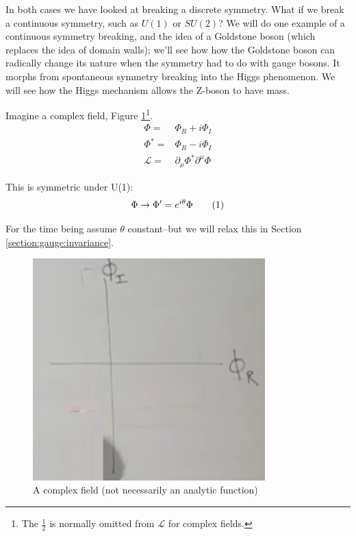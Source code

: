 \documentclass[]{article}
\newcommand\numberthis{\addtocounter{equation}{1}\tag{\theequation}}
\begin{document}
In both cases we have looked at breaking a discrete symmetry. What if we break a continuous symmetry, such as $U(1)$ or $SU(2)$? We will do one example of a continuous symmetry breaking, and the idea of a Goldstone boson (which replaces the idea of domain walls); we'll see how how the Goldstone boson can radically change its nature when the symmetry had to do with gauge bosons. It morphs from spontaneous symmetry breaking into the Higgs phenomenon. We will see how the Higgs mechanism allows the Z-boson to have mass.


Imagine a complex field, Figure \ref{fig:2-7-complex-phi}\footnote{The $\frac{1}{2}$ is normally omitted from $\mathcal{L}$ for complex fields.}.
\begin{align*}
	\Phi =& \Phi_R + i \Phi_I \\
	\Phi^* =& \Phi_R - i \Phi_I\\
	\mathcal{L} =&  \partial_\mu \Phi^* \partial^\mu \Phi 
\end{align*}

This is symmetric under U(1):
\begin{align*}
	\Phi \rightarrow \Phi^\prime=e^{i \theta} \Phi  \numberthis \label{eq:U1:theta}
\end{align*}

For the time being assume $\theta$ constant--but we will relax this in Section \ref{section:gauge:invariance}.

\begin{figure}[H]
	\caption{A complex field (not necessarily an analytic function)}\label{fig:2-7-complex-phi}
	\includegraphics[width=0.8\textwidth]{2-7-complex-phi}
\end{figure}
\end{document}
